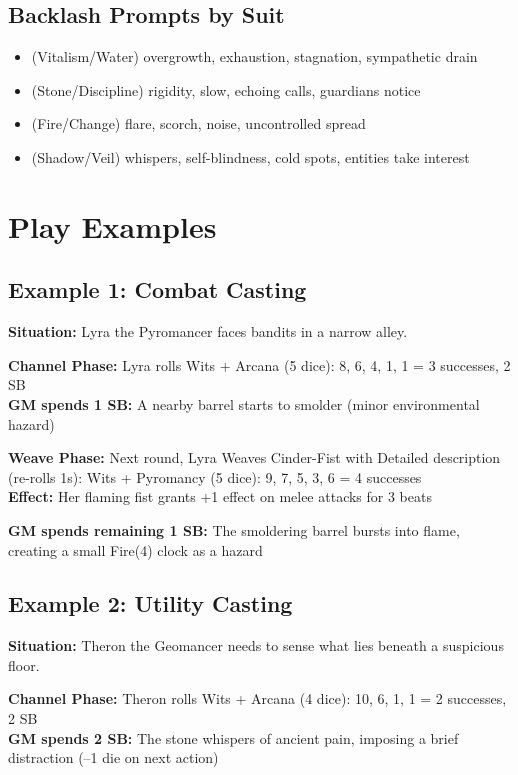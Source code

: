 \documentclass[11pt]{report}
\begin{document}
\subsection{Backlash Prompts by Suit}
\begin{itemize}
    \item \heartsuit (Vitalism/Water) overgrowth, exhaustion, stagnation, sympathetic drain
    \item \clubsuit (Stone/Discipline) rigidity, slow, echoing calls, guardians notice
    \item \diamondsuit (Fire/Change) flare, scorch, noise, uncontrolled spread
    \item \spadesuit (Shadow/Veil) whispers, self-blindness, cold spots, entities take interest
\end{itemize}

\section{Play Examples}

\subsection{Example 1: Combat Casting}
\textbf{Situation:} Lyra the Pyromancer faces bandits in a narrow alley.

\textbf{Channel Phase:} Lyra rolls Wits + Arcana (5 dice): 8, 6, 4, 1, 1 = 3 successes, 2 SB\\
\textbf{GM spends 1 SB:} A nearby barrel starts to smolder (minor environmental hazard)

\textbf{Weave Phase:} Next round, Lyra Weaves Cinder-Fist with Detailed description (re-rolls 1s): Wits + Pyromancy (5 dice): 9, 7, 5, 3, 6 = 4 successes\\
\textbf{Effect:} Her flaming fist grants +1 effect on melee attacks for 3 beats

\textbf{GM spends remaining 1 SB:} The smoldering barrel bursts into flame, creating a small Fire(4) clock as a hazard

\subsection{Example 2: Utility Casting}
\textbf{Situation:} Theron the Geomancer needs to sense what lies beneath a suspicious floor.

\textbf{Channel Phase:} Theron rolls Wits + Arcana (4 dice): 10, 6, 1, 1 = 2 successes, 2 SB\\
\textbf{GM spends 2 SB:} The stone whispers of ancient pain, imposing a brief distraction (–1 die on next action)
\end{document}
